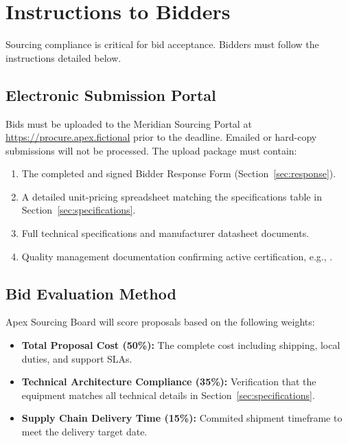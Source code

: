 \section{Instructions to Bidders}
\label{sec:instructions}

Sourcing compliance is critical for bid acceptance. Bidders must follow the instructions detailed below.

\subsection{Electronic Submission Portal}
Bids must be uploaded to the Meridian Sourcing Portal at \url{https://procure.apex.fictional} prior to the deadline. Emailed or hard-copy submissions will not be processed. The upload package must contain:
\begin{enumerate}[leftmargin=2em, label=\arabic*.]
  \item The completed and signed Bidder Response Form (Section~\ref{sec:response}).
  \item A detailed unit-pricing spreadsheet matching the specifications table in Section~\ref{sec:specifications}.
  \item Full technical specifications and manufacturer datasheet documents.
  \item Quality management documentation confirming active certification, e.g., \cite{iso9001}.
\end{enumerate}

\subsection{Bid Evaluation Method}
Apex Sourcing Board will score proposals based on the following weights:
\begin{itemize}[leftmargin=1.5em, label=\textcolor{secondary}{\faCheckCircle}]
  \item \textbf{Total Proposal Cost (50\%):} The complete cost including shipping, local duties, and support SLAs.
  \item \textbf{Technical Architecture Compliance (35\%):} Verification that the equipment matches all technical details in Section~\ref{sec:specifications}.
  \item \textbf{Supply Chain Delivery Time (15\%):} Commited shipment timeframe to meet the delivery target date.
\end{itemize}

